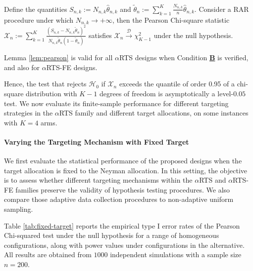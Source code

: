 \begin{lemma}\label{lem:pearson}
		Define the quantities \(S_{n,k} := N_{n,k} \hat{\theta}_{n,k}\) and 
		\(\tilde{\theta}_n := \sum_{k=1}^K \frac{N_{n,k}}{n} \hat{\theta}_{n,k}\).	
		Consider a RAR procedure under which \(N_{n,k} \to +\infty\), then the Pearson Chi-square statistic \(\mathcal{X}_n := \sum_{k=1}^K \frac{\left(S_{n,k} - N_{n,k}\tilde{\theta}_n\right)^2}{N_{n,k}\tilde{\theta}_n (1 - \tilde{\theta}_n)}\)
		satisfies
		\(\mathcal{X}_n \xrightarrow{\mathcal{D}} \chi^2_{K-1}\) under the null hypothesis.
	\end{lemma}
	\begin{remark}
		Lemma \ref{lem:pearson} is valid for all \(\alpha\)RTS designs when Condition \hyperlink{CB}{\textbf{B}} is verified, and also for \(\alpha\)RTS-FE designs.
\end{remark}

{Hence, the test that rejects $\mathcal{H}_0$ if $\mathcal{X}_n$ exceeds the quantile of order 0.95 of a chi-square distribution with $K-1$ degrees of freedom is asymptotically a level-$0.05$ test.} We now evaluate its finite-sample performance for different targeting strategies in the $\alpha$RTS family and different target allocations, on some instances with $K=4$ arms.


\paragraph*{Varying the Targeting Mechanism with Fixed Target}
We first evaluate the statistical performance of the proposed designs when the target allocation is fixed to the Neyman allocation. In this setting, the objective is to assess whether different targeting mechanisms within the $\alpha$RTS and $\alpha$RTS-FE families preserve the validity of hypothesis testing procedures. We also compare those adaptive data collection procedures to non-adaptive uniform sampling. 

Table \ref{tab:fixed-target} reports the empirical type I error rates of the Pearson Chi-squared test under the null hypothesis for a range of homogeneous configurations, along with power values under configurations in the alternative. All results are obtained from $1000$ independent simulations with a sample size $n=200$.

